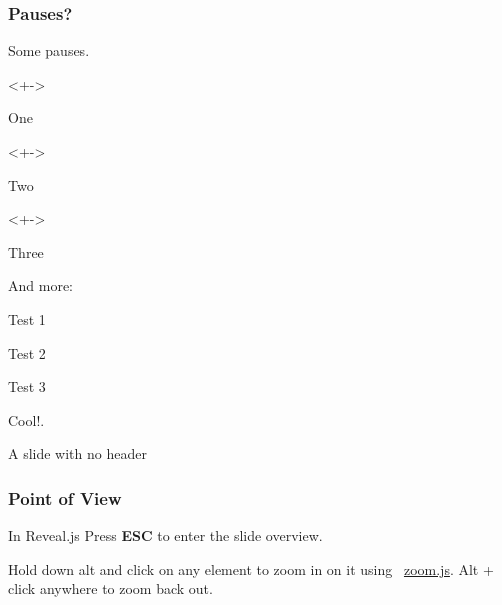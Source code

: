 \documentclass[xcolor=table]{beamer}
\begin{document}
\begin{mdframe}%

\frametitle{Pauses?}\label{heading-sec-pauses}%

\noindent{}Some pauses.%

\begin{itemize}[noitemsep,topsep=\mdcompacttopsep]%

\begin{onlyenv}<+->%
\item{}One
\end{onlyenv}%

\begin{onlyenv}<+->%
\item{}Two
\end{onlyenv}%

\begin{onlyenv}<+->%
\item{}Three
\end{onlyenv}%
\end{itemize}%

\noindent{}And more:%

\begin{itemize}[noitemsep,topsep=\mdcompacttopsep]%
\begin{mdfragmented}%

\item{}Test 1%

\item{}Test 2%

\item{}Test 3%
\end{mdfragmented}%
\end{itemize}%

\noindent{}Cool!.%
\end{mdframe}\label{sec-pauses}%

\begin{mdframe}%

\noindent{}A slide with no header%
\end{mdframe}%

\begin{mdframe}%

\frametitle{Point of View}\label{heading-sec-point-of-view}%

\noindent{}In Reveal.js Press \textbf{ESC} to enter the slide overview.%

Hold down alt and click on any element to zoom in on it using 
~\href{http://lab.hakim.se/zoom-js}{zoom.js}. Alt + click anywhere to zoom back out.%
\end{mdframe}\label{sec-point-of-view}%
\end{document}
